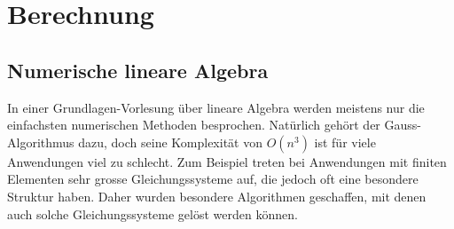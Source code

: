 %
%
%
\part{Berechnung}

\chapter*{Numerische lineare Algebra}
In einer Grundlagen-Vorlesung über lineare Algebra werden meistens nur
die einfachsten numerischen Methoden besprochen.
Natürlich gehört der Gauss-Algorithmus dazu, doch seine Komplexität
von $O(n^3)$ ist für viele Anwendungen viel zu schlecht.
Zum Beispiel treten bei Anwendungen mit finiten Elementen sehr grosse
Gleichungssysteme auf, die jedoch oft eine besondere Struktur haben.
Daher wurden besondere Algorithmen geschaffen, mit denen auch solche
Gleichungssysteme gelöst werden können.






